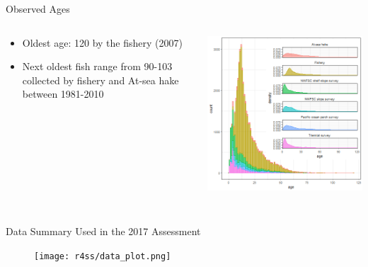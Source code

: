 \documentclass[pdf]{beamer}\usepackage[]{graphicx}\usepackage[]{color}
\begin{document}
\begin{frame}{Observed Ages}
  \begin{columns}
    \begin{column}{0.35\textwidth}
      \begin{itemize}
      \item Oldest age: 120 by the fishery (2007)
      \item Next oldest fish range from 90-103 collected by fishery and At-sea hake between 1981-2010
      \end{itemize}
    \end{column}
    \begin{column}{0.65\textwidth}
      \includegraphics[scale = 0.45]{figures/pop2017_agesbysource.png}
    \end{column}
  \end{columns}
\end{frame}


\subsection{}
\begin{frame}{Data Summary Used in the 2017 Assessment}
  \begin{figure}[ht]
    \begin{center}
      \texttt{[image: r4ss/data\_plot.png]}

    \end{center}
  \end{figure}
\end{frame}
\end{document}
